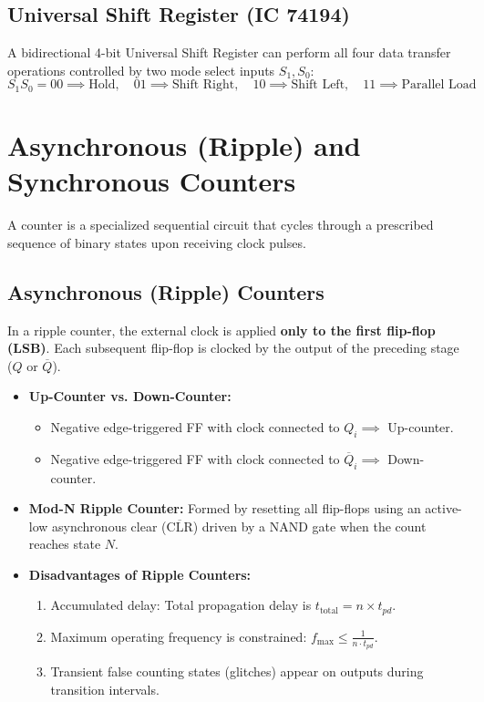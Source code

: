 \documentclass[12pt,a4paper]{article}
\begin{document}
\subsection{Universal Shift Register (IC 74194)}
A bidirectional 4-bit Universal Shift Register can perform all four data transfer operations controlled by two mode select inputs $S_1, S_0$:
\begin{equation}
  S_1 S_0 = 00 \implies \text{Hold}, \quad 01 \implies \text{Shift Right}, \quad 10 \implies \text{Shift Left}, \quad 11 \implies \text{Parallel Load}
\end{equation}

\section{Asynchronous (Ripple) and Synchronous Counters}

A counter is a specialized sequential circuit that cycles through a prescribed sequence of binary states upon receiving clock pulses.

\subsection{Asynchronous (Ripple) Counters}
In a ripple counter, the external clock is applied \textbf{only to the first flip-flop (LSB)}. Each subsequent flip-flop is clocked by the output of the preceding stage ($Q$ or $\overline{Q}$).
\begin{itemize}[leftmargin=*, itemsep=3pt]
  \item \textbf{Up-Counter vs. Down-Counter:}
    \begin{itemize}
      \item Negative edge-triggered FF with clock connected to $Q_i \implies$ Up-counter.
      \item Negative edge-triggered FF with clock connected to $\overline{Q}_i \implies$ Down-counter.
    \end{itemize}
  \item \textbf{Mod-N Ripple Counter:} Formed by resetting all flip-flops using an active-low asynchronous clear ($\overline{\text{CLR}}$) driven by a NAND gate when the count reaches state $N$.
  \item \textbf{Disadvantages of Ripple Counters:}
    \begin{enumerate}
      \item Accumulated delay: Total propagation delay is $t_{\text{total}} = n \times t_{pd}$.
      \item Maximum operating frequency is constrained: $f_{\text{max}} \le \frac{1}{n \cdot t_{pd}}$.
      \item Transient false counting states (glitches) appear on outputs during transition intervals.
    \end{enumerate}
\end{itemize}
\end{document}
